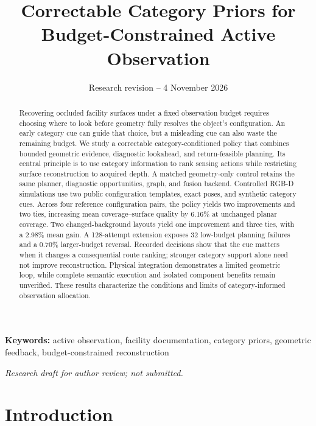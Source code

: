 \documentclass[11pt,a4paper]{article}
\providecommand{\hypertarget}[2]{#2}
\begin{document}
\title{Correctable Category Priors for Budget-Constrained Active Observation}
\author{}
\date{Research revision -- 4 November 2026}
\maketitle
\begin{abstract}
Recovering occluded facility surfaces under a fixed observation budget requires choosing where to look before geometry fully resolves the object's configuration. An early category cue can guide that choice, but a misleading cue can also waste the remaining budget. We study a correctable category-conditioned policy that combines bounded geometric evidence, diagnostic lookahead, and return-feasible planning. Its central principle is to use category information to rank sensing actions while restricting surface reconstruction to acquired depth. A matched geometry-only control retains the same planner, diagnostic opportunities, graph, and fusion backend. Controlled RGB-D simulations use two public configuration templates, exact poses, and synthetic category cues. Across four reference configuration pairs, the policy yields two improvements and two ties, increasing mean coverage--surface quality by 6.16\% at unchanged planar coverage. Two changed-background layouts yield one improvement and three ties, with a 2.98\% mean gain. A 128-attempt extension exposes 32 low-budget planning failures and a 0.70\% larger-budget reversal. Recorded decisions show that the cue matters when it changes a consequential route ranking; stronger category support alone need not improve reconstruction. Physical integration demonstrates a limited geometric loop, while complete semantic execution and isolated component benefits remain unverified. These results characterize the conditions and limits of category-informed observation allocation.
\end{abstract}
\noindent\textbf{Keywords:} active observation, facility documentation, category priors, geometric feedback, budget-constrained reconstruction

\noindent\textit{Research draft for author review; not submitted.}

\hypertarget{introduction}{%
\section{Introduction}\label{introduction}}
\end{document}
